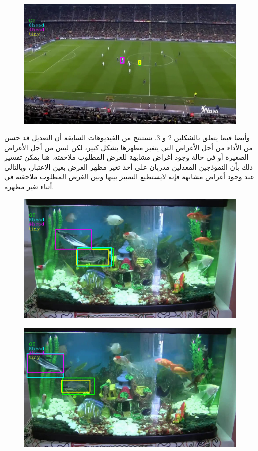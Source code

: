 \begin{figure}[H]
	\centerline{\includegraphics[width=\textwidth]{images/results/failed/project_175.avi1}}
	\caption{}
	\label{fig:video_fail_1}
\end{figure}	
	وأيضا فيما يتعلق بالشكلين
	\ref{fig:video_fail_2_initial}
		و
	\ref{fig:video_fail_2}.
	نستنتج من الفيديوهات السابقة أن التعديل قد حسن من الأداء من أجل الأغراض التي يتغير مظهرها بشكل كبير، لكن ليس من أجل الأغراض الصغيرة أو في حالة وجود أغراض مشابهة للغرض المطلوب ملاحقته.
	هنا يمكن تفسير ذلك بأن النموذجين المعدلين مدربان على أخذ تغير مظهر الغرض بعين الاعتبار، وبالتالي عند وجود أغراض مشابهة فإنه لايستطيع التمييز بينها وبين الغرض المطلوب ملاحقته في أثناء تغير مظهره.
\begin{figure}[H]
	\centerline{\includegraphics[width=\textwidth]{images/results/failed/project_129.avi2}}
	\caption{}
	\label{fig:video_fail_2_initial}
\end{figure}

\begin{figure}[H]
	\centerline{\includegraphics[width=\textwidth]{images/results/failed/project_129.avi3}}
	\caption{}
	\label{fig:video_fail_2}
\end{figure}
